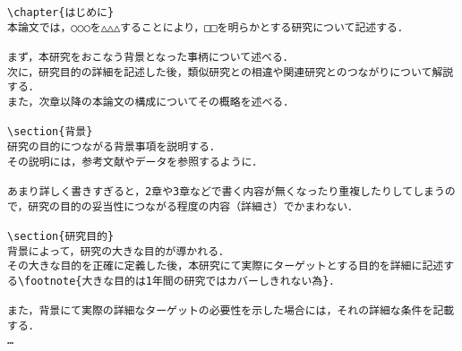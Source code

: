 \begin{breakbox}
{\footnotesize
\begin{verbatim}
\chapter{はじめに}
本論文では，○○○を△△△することにより，□□を明らかとする研究について記述する．

まず，本研究をおこなう背景となった事柄について述べる．
次に，研究目的の詳細を記述した後，類似研究との相違や関連研究とのつながりについて解説する．
また，次章以降の本論文の構成についてその概略を述べる．

\section{背景}
研究の目的につながる背景事項を説明する．
その説明には，参考文献やデータを参照するように．

あまり詳しく書きすぎると，2章や3章などで書く内容が無くなったり重複したりしてしまうので，研究の目的の妥当性につながる程度の内容（詳細さ）でかまわない．

\section{研究目的}
背景によって，研究の大きな目的が導かれる．
その大きな目的を正確に定義した後，本研究にて実際にターゲットとする目的を詳細に記述する\footnote{大きな目的は1年間の研究ではカバーしきれない為}．

また，背景にて実際の詳細なターゲットの必要性を示した場合には，それの詳細な条件を記載する．
…
\end{verbatim}
}
\end{breakbox}


